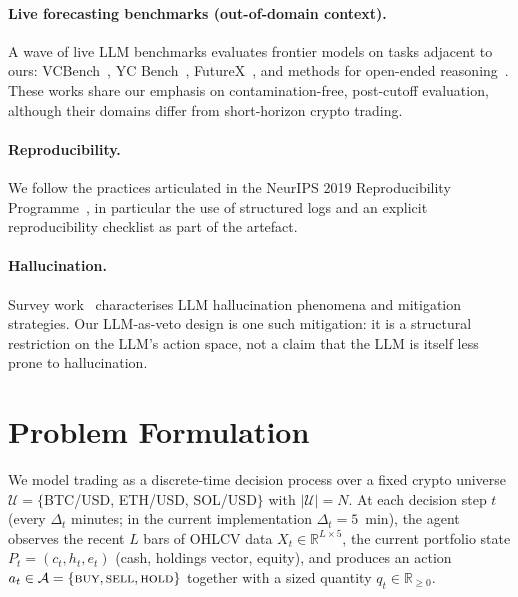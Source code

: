 \documentclass{article}
\begin{document}
\paragraph{Live forecasting benchmarks (out-of-domain context).} A wave of live LLM benchmarks evaluates frontier models on tasks adjacent to ours: VCBench~\cite{vcbench}, YC Bench~\cite{ycbench}, FutureX~\cite{futurex}, and methods for open-ended reasoning~\cite{scaling_open_ended}. These works share our emphasis on contamination-free, post-cutoff evaluation, although their domains differ from short-horizon crypto trading.
\paragraph{Reproducibility.} We follow the practices articulated in the NeurIPS 2019 Reproducibility Programme~\cite{pineau_reproducibility2020}, in particular the use of structured logs and an explicit reproducibility checklist as part of the artefact.
\paragraph{Hallucination.} Survey work~\cite{hallucination_survey_zhang2023} characterises LLM hallucination phenomena and mitigation strategies. Our LLM-as-veto design is one such mitigation: it is a structural restriction on the LLM\textquoteright s action space, not a claim that the LLM is itself less prone to hallucination.

\section{Problem Formulation}
\label{sec:problem}
We model trading as a discrete-time decision process over a fixed crypto universe $\mathcal{U} = \{$BTC/USD, ETH/USD, SOL/USD$\}$ with $|\mathcal{U}| = N$. At each decision step $t$ (every $\Delta_t$ minutes; in the current implementation $\Delta_t = 5$~min), the agent observes the recent $L$ bars of OHLCV data $X_t \in \mathbb{R}^{L \times 5}$, the current portfolio state $P_t = (c_t, h_t, e_t)$ (cash, holdings vector, equity), and produces an action $a_t \in \mathcal{A} = \{\textsc{buy}, \textsc{sell}, \textsc{hold}\}$ together with a sized quantity $q_t \in \mathbb{R}_{\geq 0}$.
\end{document}
